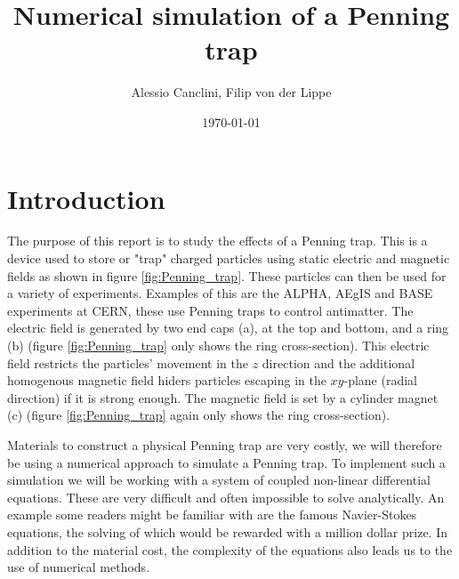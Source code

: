 \documentclass[english,notitlepage,reprint,nofootinbib]{revtex4-1}  %
\begin{document}
\title{Numerical simulation of a Penning trap}  %
\author{Alessio Canclini, Filip von der Lippe} %
\date{\today}                             %
\noaffiliation                            %

\begin{abstract}
\end{abstract}
\maketitle


\section{Introduction}
The purpose of this report is to study the effects of a Penning trap. This is a device used to store or "trap" charged particles 
using static electric and magnetic fields as shown in figure \ref*{fig:Penning_trap}. These particles can then be used for a variety of experiments. Examples of this are the ALPHA, AEgIS and BASE 
experiments at CERN, these use Penning traps to control antimatter. 
The electric field is generated by two end caps (a), at the top and bottom, 
and a ring (b) (figure \ref*{fig:Penning_trap} only shows the ring cross-section).
This electric field restricts the particles' movement in the $z$ direction and the additional homogenous magnetic field 
hiders particles escaping in the $xy$-plane (radial direction) if it is strong enough. The magnetic field is set by 
a cylinder magnet (c) (figure \ref*{fig:Penning_trap} again only shows the ring cross-section). 

Materials to construct a physical Penning trap are very costly, we will therefore 
be using a numerical approach to simulate a Penning trap. To implement such a simulation 
we will be working with a system of coupled non-linear differential equations. These are very 
difficult and often impossible to solve analytically. An example some readers might be familiar with are the famous 
Navier-Stokes equations, the solving of which would be rewarded with a million dollar prize. In addition to the 
material cost, the complexity of the equations also leads us to the use of numerical methods.
\end{document}

